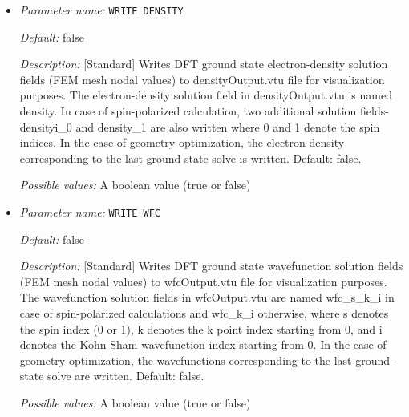\begin{itemize}
{\it Default:} 1


{\it Description:} [Standard] Parameter to control verbosity of terminal output. Ranges from 1 for low, 2 for medium (prints eigenvalues and fractional occupancies at the end of each ground-state solve), 3 for high (prints eigenvalues and fractional occupancies at the end of each self-consistent field iteration), and 4 for very high, which is only meant for code development purposes. VERBOSITY=0 is only used for unit testing and shouldn't be used by standard users.


{\it Possible values:} An integer $n$ such that $0\leq n \leq 4$
\item {\it Parameter name:} {\tt WRITE DENSITY}
\label{parameters:WRITE DENSITY}
\label{parameters:WRITE_20DENSITY}




{\it Default:} false


{\it Description:} [Standard] Writes DFT ground state electron-density solution fields (FEM mesh nodal values) to densityOutput.vtu file for visualization purposes. The electron-density solution field in densityOutput.vtu is named density. In case of spin-polarized calculation, two additional solution fields- densityi\_0 and density\_1 are also written where 0 and 1 denote the spin indices. In the case of geometry optimization, the electron-density corresponding to the last ground-state solve is written. Default: false.


{\it Possible values:} A boolean value (true or false)
\item {\it Parameter name:} {\tt WRITE WFC}
\label{parameters:WRITE WFC}
\label{parameters:WRITE_20WFC}




{\it Default:} false


{\it Description:} [Standard] Writes DFT ground state wavefunction solution fields (FEM mesh nodal values) to wfcOutput.vtu file for visualization purposes. The wavefunction solution fields in wfcOutput.vtu are named wfc\_s\_k\_i in case of spin-polarized calculations and wfc\_k\_i otherwise, where s denotes the spin index (0 or 1), k denotes the k point index starting from 0, and i denotes the Kohn-Sham wavefunction index starting from 0. In the case of geometry optimization, the wavefunctions corresponding to the last ground-state solve are written.  Default: false.


{\it Possible values:} A boolean value (true or false)
\end{itemize}



